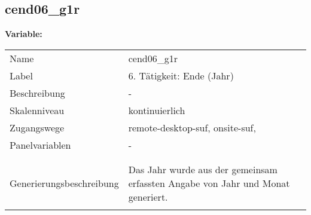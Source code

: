 	
	
	\subsection{cend06\_g1r}
	\label{subSection:cend06_g1r}

	\noindent\textbf{Variable:}\\
		\begin{tabular}{lL{11.3cm}}
			\label{tableVariable:cend06_g1r}
			Name & cend06\_g1r \\
			Label & 6. Tätigkeit: Ende (Jahr)  \\
			Beschreibung & - \\
			Skalenniveau & kontinuierlich \\
			Zugangswege &
				remote-desktop-suf,
				onsite-suf,
 \\
			Panelvariablen & -
			 \\
			 \\
 \\
					Generierungsbeschreibung & Das Jahr wurde aus der gemeinsam erfassten Angabe von Jahr und Monat generiert. 
				 \\	
			 \\
		\end{tabular}





